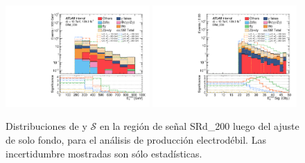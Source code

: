 \begin{figure}[ht!]
  \centering

    \includegraphics[width=0.49\textwidth]{images/analysis_EWK/v192_1_nosyst/can_SRd_200_met_et_afterFit.pdf}
    \includegraphics[width=0.49\textwidth]{images/analysis_EWK/v192_1_nosyst/can_SRd_200_met_sig_obj_afterFit.pdf}

    \caption{Distribuciones de \met y $\mathcal{S}$ en la región de señal SRd\_200 luego del ajuste de solo fondo, para el análisis de producción electrodébil. Las incertidumbre mostradas son sólo estadísticas.}
    \label{fig:srd_ewk}

\end{figure}

